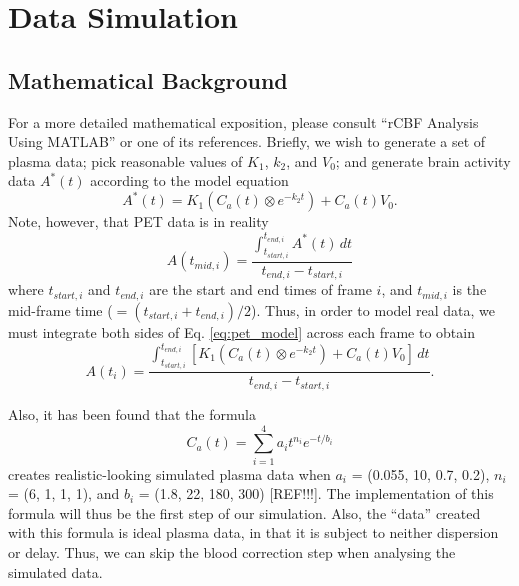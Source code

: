 \documentclass[11pt]{article}
\begin{document}




\section{Data Simulation}

\subsection{Mathematical Background}
For a more detailed mathematical exposition, please consult ``rCBF
Analysis Using MATLAB'' or one of its references.  Briefly, we wish
to generate a set of plasma data; pick reasonable values of $K_{1}$,
$k_{2}$, and $V_{0}$; and generate brain activity data $A^{*}(t)$ according
to the model equation
\begin{equation}
A^{*}(t) = K_{1} (C_{a}(t) \otimes e^{-k_{2}t}) + C_{a}(t)V_{0}.
\label{eq:pet_model}
\end{equation}
Note, however, that PET data is in reality
\begin{equation}
A(t_{mid,i}) = \frac{\int_{t_{start,i}}^{t_{end,i}} A^{*}(t) \,dt}{t_{end,i} - t_{start,i}}
\label{eq:frameint}
\end{equation}
where $t_{start,i}$ and $t_{end,i}$ are the start and end times of
frame $i$, and $t_{mid,i}$ is the mid-frame time ($ = (t_{start,i} +
t_{end,i}) / 2$).  Thus, in order to model real data, we must integrate
both sides of Eq. \ref{eq:pet_model} across each frame to obtain
\begin{equation}
A(t_{i}) = \frac{\int_{t_{start,i}}^{t_{end,i}} [K_{1} (C_{a}(t) \otimes e^{-k_{2}t}) + C_{a}(t)V_{0}] \,dt}{t_{end,i} - t_{start,i}}.
\label{eq:pet_data_model}
\end{equation}

Also, it has been found that the formula
\begin{equation}
C_{a}(t) = \sum_{i=1}^{4} a_{i} t^{n_{i}} e^{-t/b_{i}}
\label{eq:gen_ca}
\end{equation}
creates realistic-looking simulated plasma data when $a_{i}$ = (0.055,
10, 0.7, 0.2), $n_{i}$ = (6, 1, 1, 1), and $b_{i}$ = (1.8, 22, 180, 300)
[REF!!!].  The implementation of this formula will thus be the first step of
our simulation.  Also, the ``data'' created with this formula is ideal
plasma data, in that it is subject to neither dispersion or delay.
Thus, we can skip the blood correction step when analysing the
simulated data.
\end{document}
